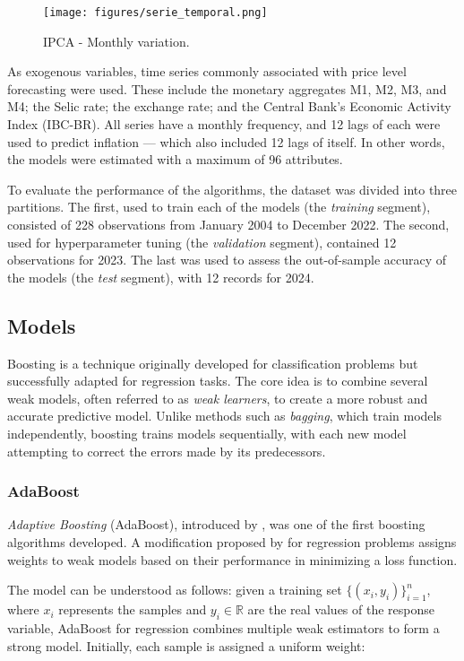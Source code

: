 \begin{figure}[h!]
    \centering
    \texttt{[image: figures/serie\_temporal.png]} %
    \caption{IPCA - Monthly variation.}
    \label{fig:example}
\end{figure}

As exogenous variables, time series commonly associated with price level forecasting were used. These include the monetary aggregates M1, M2, M3, and M4; the Selic rate; the exchange rate; and the Central Bank's Economic Activity Index (IBC-BR). All series have a monthly frequency, and 12 lags of each were used to predict inflation — which also included 12 lags of itself. In other words, the models were estimated with a maximum of 96 attributes.

To evaluate the performance of the algorithms, the dataset was divided into three partitions. The first, used to train each of the models (the \textit{training} segment), consisted of 228 observations from January 2004 to December 2022. The second, used for hyperparameter tuning (the \textit{validation} segment), contained 12 observations for 2023. The last was used to assess the out-of-sample accuracy of the models (the \textit{test} segment), with 12 records for 2024.

\subsection{Models}
Boosting is a technique originally developed for classification problems but successfully adapted for regression tasks. The core idea is to combine several weak models, often referred to as \textit{weak learners}, to create a more robust and accurate predictive model. Unlike methods such as \textit{bagging}, which train models independently, boosting trains models sequentially, with each new model attempting to correct the errors made by its predecessors.

\subsubsection{AdaBoost}
\textit{Adaptive Boosting} (AdaBoost), introduced by \cite{freund1997decision}, was one of the first boosting algorithms developed. A modification proposed by \cite{drucker1997boosting} for regression problems assigns weights to weak models based on their performance in minimizing a loss function.

The model can be understood as follows: given a training set $\{(x_i, y_i)\}_{i=1}^{n}$, where $x_i$ represents the samples and $y_i \in \mathbb{R}$ are the real values of the response variable, AdaBoost for regression combines multiple weak estimators to form a strong model. Initially, each sample is assigned a uniform weight:

